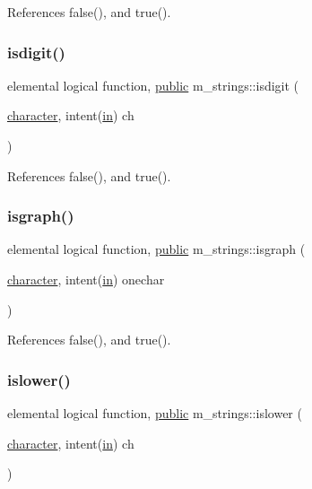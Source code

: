 References false(), and true().

\mbox{\label{namespacem__strings_a9f5f98a6c93e21618a16d98a5de2debc}} 
\subsubsection{\texorpdfstring{isdigit()}{isdigit()}}
{\footnotesize\ttfamily elemental logical function, \hyperlink{M__stopwatch_83_8txt_a2f74811300c361e53b430611a7d1769f}{public} m\+\_\+strings\+::isdigit (\begin{DoxyParamCaption}\item[{\hyperlink{option__stopwatch_83_8txt_abd4b21fbbd175834027b5224bfe97e66}{character}, intent(\hyperlink{M__journal_83_8txt_afce72651d1eed785a2132bee863b2f38}{in})}]{ch }\end{DoxyParamCaption})}



References false(), and true().

\mbox{\label{namespacem__strings_a84c80fdeeba0679488ed8ad8d37e53c5}} 
\subsubsection{\texorpdfstring{isgraph()}{isgraph()}}
{\footnotesize\ttfamily elemental logical function, \hyperlink{M__stopwatch_83_8txt_a2f74811300c361e53b430611a7d1769f}{public} m\+\_\+strings\+::isgraph (\begin{DoxyParamCaption}\item[{\hyperlink{option__stopwatch_83_8txt_abd4b21fbbd175834027b5224bfe97e66}{character}, intent(\hyperlink{M__journal_83_8txt_afce72651d1eed785a2132bee863b2f38}{in})}]{onechar }\end{DoxyParamCaption})}



References false(), and true().

\mbox{\label{namespacem__strings_a9de5290748f02f575f3b7b859ff074ed}} 
\subsubsection{\texorpdfstring{islower()}{islower()}}
{\footnotesize\ttfamily elemental logical function, \hyperlink{M__stopwatch_83_8txt_a2f74811300c361e53b430611a7d1769f}{public} m\+\_\+strings\+::islower (\begin{DoxyParamCaption}\item[{\hyperlink{option__stopwatch_83_8txt_abd4b21fbbd175834027b5224bfe97e66}{character}, intent(\hyperlink{M__journal_83_8txt_afce72651d1eed785a2132bee863b2f38}{in})}]{ch }\end{DoxyParamCaption})}



